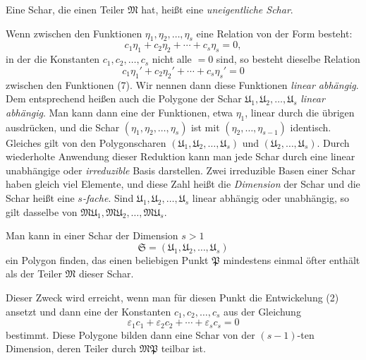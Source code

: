 \documentclass[12pt,a4paper]{article}
\begin{document}
Eine Schar, die einen Teiler $\mathfrak{M}$ hat, heißt eine \emph{uneigentliche Schar}.

Wenn zwischen den Funktionen $\eta_1, \eta_2, \ldots, \eta_s$ eine Relation von der Form besteht:
\begin{equation}\label{eq:192-10}
c_1\eta_1 + c_2\eta_2 + \cdots + c_s\eta_s = 0,
\end{equation}
in der die Konstanten $c_1, c_2, \ldots, c_s$ nicht alle $= 0$ sind, so besteht dieselbe Relation
\begin{equation}\label{eq:192-11}
c_1\eta_1' + c_2\eta_2' + \cdots + c_s\eta_s' = 0
\end{equation}
zwischen den Funktionen (7). Wir nennen dann diese Funktionen \emph{linear abhängig}. Dem entsprechend heißen auch die Polygone der Schar $\mathfrak{U}_1, \mathfrak{U}_2, \ldots, \mathfrak{U}_s$ \emph{linear abhängig}. Man kann dann eine der Funktionen, etwa $\eta_1$, linear durch die übrigen ausdrücken, und die Schar $(\eta_1, \eta_2, \ldots, \eta_s)$ ist mit $(\eta_2, \ldots, \eta_{s-1})$ identisch. Gleiches gilt von den Polygonscharen $(\mathfrak{U}_1, \mathfrak{U}_2, \ldots, \mathfrak{U}_s)$ und $(\mathfrak{U}_2, \ldots, \mathfrak{U}_s)$. Durch wiederholte Anwendung dieser Reduktion kann man jede Schar durch eine linear unabhängige oder \emph{irreduzible} Basis darstellen. Zwei irreduzible Basen einer Schar haben gleich viel Elemente, und diese Zahl heißt die \emph{Dimension} der Schar und die Schar heißt eine \emph{$s$-fache}. Sind $\mathfrak{U}_1, \mathfrak{U}_2, \ldots, \mathfrak{U}_s$ linear abhängig oder unabhängig, so gilt dasselbe von $\mathfrak{M}\mathfrak{U}_1, \mathfrak{M}\mathfrak{U}_2, \ldots, \mathfrak{M}\mathfrak{U}_s$.

Man kann in einer Schar der Dimension $s > 1$
\begin{equation}\label{eq:192-12}
\mathfrak{S} = (\mathfrak{U}_1, \mathfrak{U}_2, \ldots, \mathfrak{U}_s)
\end{equation}
ein Polygon finden, das einen beliebigen Punkt $\mathfrak{P}$ mindestens einmal öfter enthält als der Teiler $\mathfrak{M}$ dieser Schar.

Dieser Zweck wird erreicht, wenn man für diesen Punkt die Entwickelung (2) ansetzt und dann eine der Konstanten $c_1, c_2, \ldots, c_s$ aus der Gleichung
\begin{equation}\label{eq:192-13}
\varepsilon_1 c_1 + \varepsilon_2 c_2 + \cdots + \varepsilon_s c_s = 0
\end{equation}
bestimmt. Diese Polygone bilden dann eine Schar von der $(s-1)$-ten Dimension, deren Teiler durch $\mathfrak{M}\mathfrak{P}$ teilbar ist.
\end{document}
